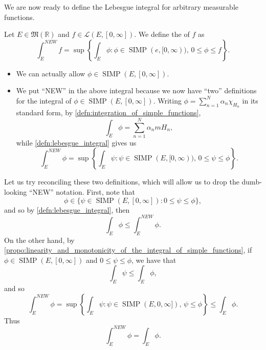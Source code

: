 \documentclass[notoc,notitlepage]{tufte-book}
\DeclareMathOperator{\SIMP}{SIMP}
\begin{document}
We are now ready to define the Lebesgue integral for arbitrary measurable
functions.

\begin{defn}\label{defn:lebesgue_integral}
  Let $E \in \mathfrak{M}(\mathbb{R})$ and $f \in \mathcal{L}(E, [0, \infty])$.
  We define the  of $f$ as
  \begin{equation*}
    \int_{E}^{NEW} f = \sup \left\{ \int_{E} \phi : \phi \in \SIMP(e, [0,
    \infty)),\, 0 \leq \phi \leq f \right\}.
  \end{equation*}
\end{defn}

\begin{note}
  \begin{itemize}
    \item We can actually allow $\phi \in \SIMP(E, [0, \infty])$.
    \item We put ``NEW'' in the above integral because we now have ``two''
      definitions for the integral of $\phi \in \SIMP(E, [0, \infty])$. Writing
      $\phi = \sum_{n=1}^{N} \alpha_n \chi_{H_n}$ in its standard form, by
      \cref{defn:integration_of_simple_functions},
      \begin{equation*}
        \int_{E} \phi = \sum_{n=1}^{N} \alpha_n mH_n,
      \end{equation*}
      while \cref{defn:lebesgue_integral} gives us
      \begin{equation*}
        \int_{E}^{NEW} \phi = \sup \left\{ \int_{E} \psi : \psi \in \SIMP(E, [0,
        \infty)),\, 0 \leq \psi \leq \phi \right\}.
      \end{equation*}
  \end{itemize}
\end{note}

\begin{remark}
  Let us try reconciling these two definitions, which will allow us to drop the
  dumb-looking ``NEW'' notation. First, note that
  \begin{equation*}
    \phi \in \{ \psi \in  \SIMP(E, [0, \infty]) : 0 \leq \psi \leq \phi \},
  \end{equation*}
  and so by \cref{defn:lebesgue_integral}, then
  \begin{equation*}
    \int_{E} \phi \leq \int_{E}^{NEW} \phi.
  \end{equation*}
  On the other hand, by
  \cref{propo:linearity_and_monotonicity_of_the_integral_of_simple_functions},
  if $\phi \in \SIMP(E, [0, \infty])$ and $0 \leq \psi \leq \phi$, we have that
  \begin{equation*}
    \int_{E} \psi \leq \int_{E} \phi,
  \end{equation*}
  and so
  \begin{equation*}
    \int_{E}^{NEW} \phi = \sup \left\{ \int_{E} \psi : \psi \in \SIMP(E, 0,
    \infty]),\, \psi \leq \phi \right\} \leq \int_{E} \phi.
  \end{equation*}
  Thus
  \begin{equation*}
    \int_{E}^{NEW} \phi = \int_{E} \phi.
  \end{equation*}
\end{remark}
\end{document}

